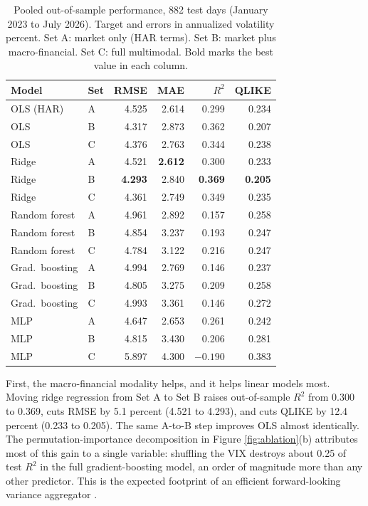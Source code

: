 \documentclass[10pt,twocolumn]{article}
\begin{document}
\begin{table}[t]
\centering\small
\caption{Pooled out-of-sample performance, 882 test days (January 2023 to July 2026). Target and errors in annualized volatility percent. Set A: market only (HAR terms). Set B: market plus macro-financial. Set C: full multimodal. Bold marks the best value in each column.}
\label{tab:main}
\begin{tabular}{llrrrr}
\toprule
Model & Set & RMSE & MAE & $R^2$ & QLIKE\\
\midrule
OLS (HAR) & A & 4.525 & 2.614 & 0.299 & 0.234\\
OLS & B & 4.317 & 2.873 & 0.362 & 0.207\\
OLS & C & 4.376 & 2.763 & 0.344 & 0.238\\
\midrule
Ridge & A & 4.521 & \textbf{2.612} & 0.300 & 0.233\\
Ridge & B & \textbf{4.293} & 2.840 & \textbf{0.369} & \textbf{0.205}\\
Ridge & C & 4.361 & 2.749 & 0.349 & 0.235\\
\midrule
Random forest & A & 4.961 & 2.892 & 0.157 & 0.258\\
Random forest & B & 4.854 & 3.237 & 0.193 & 0.247\\
Random forest & C & 4.784 & 3.122 & 0.216 & 0.247\\
\midrule
Grad.\ boosting & A & 4.994 & 2.769 & 0.146 & 0.237\\
Grad.\ boosting & B & 4.805 & 3.275 & 0.209 & 0.258\\
Grad.\ boosting & C & 4.993 & 3.361 & 0.146 & 0.272\\
\midrule
MLP & A & 4.647 & 2.653 & 0.261 & 0.242\\
MLP & B & 4.815 & 3.430 & 0.206 & 0.281\\
MLP & C & 5.897 & 4.300 & $-0.190$ & 0.383\\
\bottomrule
\end{tabular}
\end{table}

First, the macro-financial modality helps, and it helps linear models most. Moving ridge regression from Set A to Set B raises out-of-sample $R^2$ from 0.300 to 0.369, cuts RMSE by 5.1 percent (4.521 to 4.293), and cuts QLIKE by 12.4 percent (0.233 to 0.205). The same A-to-B step improves OLS almost identically. The permutation-importance decomposition in Figure \ref{fig:ablation}(b) attributes most of this gain to a single variable: shuffling the VIX destroys about 0.25 of test $R^2$ in the full gradient-boosting model, an order of magnitude more than any other predictor. This is the expected footprint of an efficient forward-looking variance aggregator \cite{whaley2000}.
\end{document}
